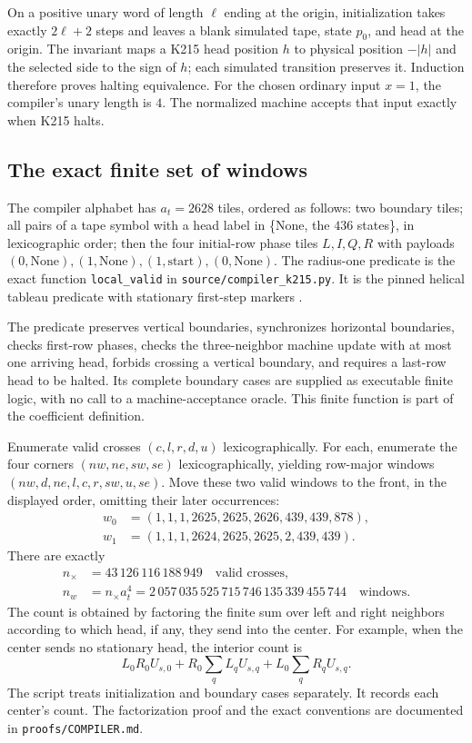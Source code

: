 \documentclass[11pt,a4paper]{article}
\theoremstyle{remark}
\newcommand{\code}[1]{\nolinkurl{#1}}
\begin{document}
On a positive unary word of length $\ell$ ending at the origin,
initialization takes exactly $2\ell+2$ steps and leaves a blank simulated
tape, state $p_0$, and head at the origin. The invariant maps a K215 head
position $h$ to physical position $-|h|$ and the selected side to the
sign of $h$; each simulated transition preserves it. Induction therefore
proves halting equivalence. For the chosen ordinary input $x=1$, the
compiler's unary length is $4$. The normalized machine accepts that
input exactly when K215 halts.

\subsection{The exact finite set of windows}

The compiler alphabet has $a_t=2628$ tiles, ordered as follows:
two boundary tiles; all pairs of a tape symbol with a head label in
\{$\mathrm{None}$, the $436$ states\}, in lexicographic order;
then the four initial-row phase tiles $L,I,Q,R$ with payloads
$(0,\mathrm{None}),(1,\mathrm{None}),(1,\mathrm{start}),(0,\mathrm{None})$.
The radius-one predicate is the exact function \code{local_valid}
in \code{source/compiler_k215.py}. It is the pinned helical tableau
predicate with stationary first-step markers \cite{helical}.

The predicate preserves vertical boundaries, synchronizes horizontal
boundaries, checks first-row phases, checks the three-neighbor machine
update with at most one arriving head, forbids crossing a vertical
boundary, and requires a last-row head to be halted. Its complete
boundary cases are supplied as executable finite logic, with no call
to a machine-acceptance oracle. This finite function is part of the
coefficient definition.

Enumerate valid crosses $(c,l,r,d,u)$ lexicographically. For each, enumerate
the four corners $(nw,ne,sw,se)$ lexicographically, yielding row-major
windows $(nw,d,ne,l,c,r,sw,u,se)$. Move these two valid windows to the
front, in the displayed order, omitting their later occurrences:
\begin{align*}
 w_0&=(1,1,1,2625,2625,2626,439,439,878),\\
 w_1&=(1,1,1,2624,2625,2625,2,439,439).
\end{align*}
There are exactly
\begin{align*}
 n_{\times}&=43\,126\,116\,188\,949\quad\text{valid crosses},\\
 n_w&=n_{\times}a_t^4
      =2\,057\,035\,525\,715\,746\,135\,339\,455\,744
      \quad\text{windows}.
\end{align*}
The count is obtained by factoring the finite sum over left and right
neighbors according to which head, if any, they send into the center.
For example, when the center sends no stationary head, the interior
count is
\[
 L_0R_0U_{s,0}+R_0\sum_q L_qU_{s,q}+L_0\sum_qR_qU_{s,q}.
\]
The script treats initialization and boundary cases separately. It
records each center's count. The factorization proof and the exact
conventions are documented in \code{proofs/COMPILER.md}.
\end{document}
